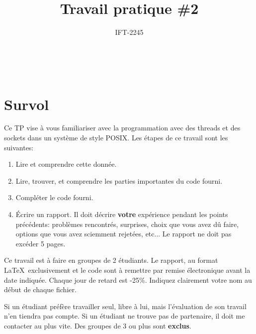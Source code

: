 \documentclass{article}
\title{Travail pratique \#2}
\author{IFT-2245}
\begin{document}
\maketitle

{\centering {} \\}

\newcommand \mML {\ensuremath\mu\textsl{ML}}
\newcommand \kw [1] {\textsf{#1}}
\newcommand \id [1] {\textsl{#1}}
\newcommand \punc [1] {\kw{`#1'}}
\newcommand \str [1] {\texttt{"#1"}}
\newenvironment{outitemize}{
  \begin{itemize}
  \let \origitem \item \def \item {\origitem[]\hspace{-18pt}}
}{
  \end{itemize}
}

\section{Survol}

Ce TP vise à vous familiariser avec la programmation avec des threads et des
sockets dans un système de style POSIX.
Les étapes de ce travail sont les suivantes:
\begin{enumerate}
\item Lire et comprendre cette donnée.  
\item Lire, trouver, et comprendre les parties importantes du code fourni.
\item Compléter le code fourni.
\item Écrire un rapport.  Il doit décrire \textbf{votre} expérience pendant
  les points précédents: problèmes rencontrés, surprises, choix que vous
  avez dû faire, options que vous avez sciemment rejetées, etc...  Le
  rapport ne doit pas excéder 5 pages.
\end{enumerate}

Ce travail est à faire en groupes de 2 étudiants.  Le rapport, au format
\LaTeX\ exclusivement et le code sont
à remettre par remise électronique avant la date indiquée.
Chaque jour de retard est -25\%.
Indiquez clairement votre nom au début de chaque fichier.

Si un étudiant préfère travailler seul, libre à lui, mais l'évaluation de
son travail n'en tiendra pas compte.  Si un étudiant ne trouve pas de
partenaire, il doit me contacter au plus vite.  Des groupes de 3 ou plus
sont \textbf{exclus}.
\end{document}
